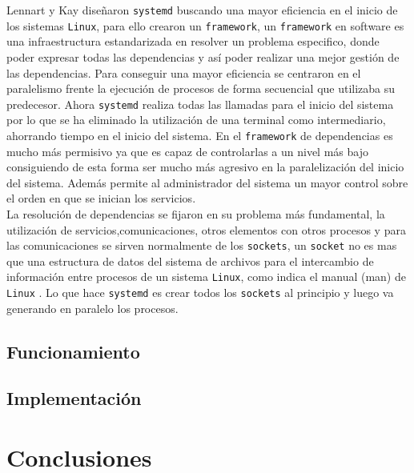 Lennart y Kay diseñaron \texttt{systemd} buscando una mayor eficiencia en el inicio de los sistemas \texttt{Linux}, para ello crearon un \texttt{framework}, un \texttt{framework} en software es una infraestructura estandarizada en resolver un problema especifico, donde poder expresar todas las dependencias y así poder realizar una mejor gestión de las dependencias. Para conseguir una mayor eficiencia se centraron en el paralelismo frente la ejecución de procesos de forma secuencial que utilizaba su predecesor. Ahora \texttt{systemd} realiza todas las llamadas para el inicio del sistema por lo que se ha eliminado la utilización de una terminal como intermediario, ahorrando tiempo en el inicio del sistema. En el \texttt{framework} de dependencias es mucho más permisivo ya que es capaz de controlarlas a un nivel más bajo consiguiendo de esta forma ser mucho más agresivo en la paralelización del inicio del sistema. Además permite al administrador del sistema un mayor control sobre el orden en que se inician los servicios.\\

La resolución de dependencias se fijaron en su problema más fundamental, la utilización de servicios,comunicaciones, otros elementos con otros procesos y  para las comunicaciones se sirven normalmente de los \texttt{sockets}, un \texttt{socket} no es mas que una estructura de datos del sistema de archivos para el intercambio de información entre procesos de un sistema \texttt{Linux}, como indica el manual (man) de \texttt{Linux} \cite{socket}.
Lo que hace \texttt{systemd} es crear todos los \texttt{sockets} al principio y luego va generando en paralelo los procesos.




\subsection{Funcionamiento}

\subsection{Implementación}

\section{Conclusiones}

